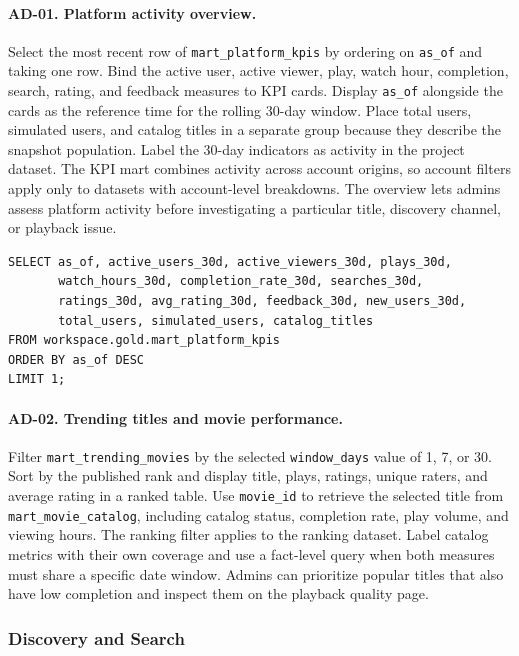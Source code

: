\documentclass[a4paper,12pt]{article}
\newcommand{\dbsep}{\_\allowbreak}
\begin{document}
\paragraph{AD-01. Platform activity overview.}
Select the most recent row of \texttt{mart\dbsep platform\dbsep kpis}
by ordering on \texttt{as\_of} and taking one row. Bind the active
user, active viewer, play, watch hour, completion, search, rating,
and feedback measures to KPI cards. Display \texttt{as\_of} alongside
the cards as the reference time for the rolling 30-day window. Place
total users, simulated users, and catalog titles in a separate group
because they describe the snapshot population. Label the 30-day
indicators as activity in the project dataset. The KPI mart combines
activity across account origins, so account filters apply only to
datasets with account-level breakdowns. The overview lets admins
assess platform activity before investigating a particular title,
discovery channel, or playback issue.

\begingroup
\small
\begin{verbatim}
SELECT as_of, active_users_30d, active_viewers_30d, plays_30d,
       watch_hours_30d, completion_rate_30d, searches_30d,
       ratings_30d, avg_rating_30d, feedback_30d, new_users_30d,
       total_users, simulated_users, catalog_titles
FROM workspace.gold.mart_platform_kpis
ORDER BY as_of DESC
LIMIT 1;
\end{verbatim}
\endgroup

\paragraph{AD-02. Trending titles and movie performance.}
Filter \texttt{mart\dbsep trending\dbsep movies} by the selected
\texttt{window\_days} value of 1, 7, or 30. Sort by the published rank
and display title, plays, ratings, unique raters, and average rating
in a ranked table. Use \texttt{movie\_id} to retrieve the selected
title from \texttt{mart\dbsep movie\dbsep catalog}, including catalog
status, completion rate, play volume, and viewing hours. The ranking
filter applies to the ranking dataset. Label catalog metrics with
their own coverage and use a fact-level query when both measures
must share a specific date window. Admins can prioritize popular
titles that also have low completion and inspect them on the
playback quality page.

\subsubsection{Discovery and Search}
\end{document}
